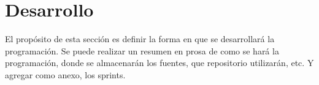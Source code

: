
\chapter{Desarrollo}

El propósito de esta sección es definir la forma en que se desarrollará la programación. 
Se puede realizar un resumen en prosa de como se hará la programación, donde se almacenarán los fuentes, que repositorio utilizarán, etc.
Y agregar como anexo, los sprints.
